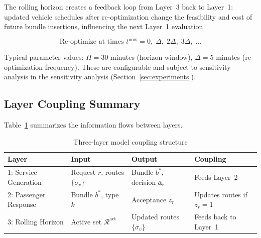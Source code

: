 The rolling horizon creates a feedback loop from Layer~3 back to Layer~1: updated vehicle
schedules after re-optimization change the feasibility and cost of future bundle insertions,
influencing the next Layer~1 evaluation.

\begin{equation}\label{eq:rh-trigger}
  \text{Re-optimize at times } t^{\text{now}} = 0,\; \Delta,\; 2\Delta,\; 3\Delta,\; \ldots
\end{equation}

Typical parameter values: $H = 30$ minutes (horizon window), $\Delta = 5$ minutes
(re-optimization frequency). These are configurable and subject to sensitivity analysis
in the sensitivity analysis (Section~\ref{sec:experiments}).

\subsection{Layer Coupling Summary}

Table~\ref{tab:layer-coupling} summarizes the information flows between layers.

\begin{table}[width=\textwidth,pos=t]
\centering
\caption{Three-layer model coupling structure}
\label{tab:layer-coupling}
\begin{tabular}{llll}
\toprule
Layer & Input & Output & Coupling \\
\midrule
1: Service Generation & Request $r$, routes $\{\sigma_v\}$ & Bundle $b^*$, decision $\mathbf{a}_r$ & Feeds Layer~2 \\
2: Passenger Response & Bundle $b^*$, type $k$ & Acceptance $z_r$ & Updates routes if $z_r=1$ \\
3: Rolling Horizon & Active set $\mathcal{R}^{\text{act}}$ & Updated routes $\{\sigma_v\}$ & Feeds back to Layer~1 \\
\bottomrule
\end{tabular}
\end{table}

